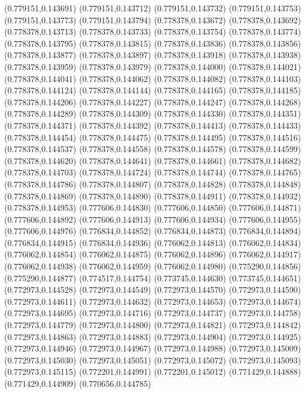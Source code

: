 (0.779151,0.143691)
(0.779151,0.143712)
(0.779151,0.143732)
(0.779151,0.143753)
(0.779151,0.143773)
(0.779151,0.143794)
(0.778378,0.143672)
(0.778378,0.143692)
(0.778378,0.143713)
(0.778378,0.143733)
(0.778378,0.143754)
(0.778378,0.143774)
(0.778378,0.143795)
(0.778378,0.143815)
(0.778378,0.143836)
(0.778378,0.143856)
(0.778378,0.143877)
(0.778378,0.143897)
(0.778378,0.143918)
(0.778378,0.143938)
(0.778378,0.143959)
(0.778378,0.143979)
(0.778378,0.144000)
(0.778378,0.144021)
(0.778378,0.144041)
(0.778378,0.144062)
(0.778378,0.144082)
(0.778378,0.144103)
(0.778378,0.144124)
(0.778378,0.144144)
(0.778378,0.144165)
(0.778378,0.144185)
(0.778378,0.144206)
(0.778378,0.144227)
(0.778378,0.144247)
(0.778378,0.144268)
(0.778378,0.144289)
(0.778378,0.144309)
(0.778378,0.144330)
(0.778378,0.144351)
(0.778378,0.144371)
(0.778378,0.144392)
(0.778378,0.144413)
(0.778378,0.144433)
(0.778378,0.144454)
(0.778378,0.144475)
(0.778378,0.144495)
(0.778378,0.144516)
(0.778378,0.144537)
(0.778378,0.144558)
(0.778378,0.144578)
(0.778378,0.144599)
(0.778378,0.144620)
(0.778378,0.144641)
(0.778378,0.144661)
(0.778378,0.144682)
(0.778378,0.144703)
(0.778378,0.144724)
(0.778378,0.144744)
(0.778378,0.144765)
(0.778378,0.144786)
(0.778378,0.144807)
(0.778378,0.144828)
(0.778378,0.144848)
(0.778378,0.144869)
(0.778378,0.144890)
(0.778378,0.144911)
(0.778378,0.144932)
(0.778378,0.144953)
(0.777606,0.144830)
(0.777606,0.144850)
(0.777606,0.144871)
(0.777606,0.144892)
(0.777606,0.144913)
(0.777606,0.144934)
(0.777606,0.144955)
(0.777606,0.144976)
(0.776834,0.144852)
(0.776834,0.144873)
(0.776834,0.144894)
(0.776834,0.144915)
(0.776834,0.144936)
(0.776062,0.144813)
(0.776062,0.144834)
(0.776062,0.144854)
(0.776062,0.144875)
(0.776062,0.144896)
(0.776062,0.144917)
(0.776062,0.144938)
(0.776062,0.144959)
(0.776062,0.144980)
(0.775290,0.144856)
(0.775290,0.144877)
(0.774517,0.144754)
(0.773745,0.144630)
(0.773745,0.144651)
(0.772973,0.144528)
(0.772973,0.144549)
(0.772973,0.144570)
(0.772973,0.144590)
(0.772973,0.144611)
(0.772973,0.144632)
(0.772973,0.144653)
(0.772973,0.144674)
(0.772973,0.144695)
(0.772973,0.144716)
(0.772973,0.144737)
(0.772973,0.144758)
(0.772973,0.144779)
(0.772973,0.144800)
(0.772973,0.144821)
(0.772973,0.144842)
(0.772973,0.144863)
(0.772973,0.144883)
(0.772973,0.144904)
(0.772973,0.144925)
(0.772973,0.144946)
(0.772973,0.144967)
(0.772973,0.144988)
(0.772973,0.145009)
(0.772973,0.145030)
(0.772973,0.145051)
(0.772973,0.145072)
(0.772973,0.145093)
(0.772973,0.145115)
(0.772201,0.144991)
(0.772201,0.145012)
(0.771429,0.144888)
(0.771429,0.144909)
(0.770656,0.144785)
